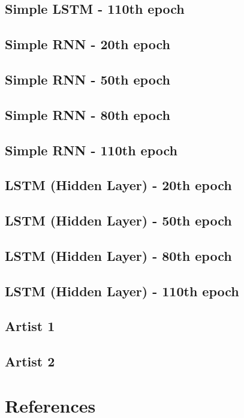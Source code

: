 \documentclass[conference]{IEEEtran}
\begin{document}
\subsection{Simple LSTM - 110th epoch}\label{LSTM110}
\subsection{Simple RNN - 20th epoch}\label{RNN20}
\subsection{Simple RNN - 50th epoch}\label{RNN50}
\subsection{Simple RNN - 80th epoch}\label{RNN80}
\subsection{Simple RNN - 110th epoch}\label{RNN110}
\subsection{LSTM (Hidden Layer) - 20th epoch}\label{HID20}
\subsection{LSTM (Hidden Layer) - 50th epoch}\label{HID50}
\subsection{LSTM (Hidden Layer) - 80th epoch}\label{HID80}
\subsection{LSTM (Hidden Layer) - 110th epoch}\label{HID110}

\subsection{Artist 1}\label{A1}
\subsection{Artist 2}\label{A2}

\section*{References}
\end{document}
